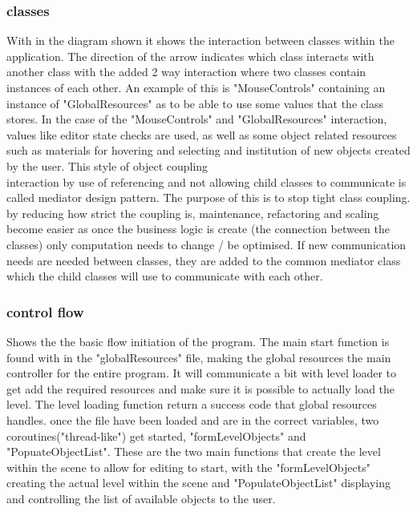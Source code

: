 \subsubsection{classes}
With in the diagram shown  it shows the interaction between classes within the application. The direction of the arrow indicates which class interacts with another class with the added 2 way interaction where two classes contain instances of each other. An example of this is "MouseControls" containing an instance of "GlobalResources" as to be able to use some values that the class stores. In the case of the "MouseControls" and "GlobalResources" interaction, values like editor state checks are used, as well as some object related resources such as materials for hovering and selecting and institution of new objects created by the user.
This style of object coupling \\ interaction by use of referencing and not allowing child classes to communicate is called mediator design pattern. The purpose of this is to stop tight class coupling. by reducing how strict the coupling is, maintenance, refactoring and scaling become easier as once the business logic is create (the connection between the classes) only computation needs to change / be optimised. If new communication needs are needed between classes, they are added to the common mediator class which the child classes will use to communicate with each other. 
\subsubsection{control flow}
 Shows the the basic flow initiation of the program. The main start function is found with in the "globalResources" file, making the global resources the main controller for the entire program. It will communicate a bit with level loader to get add the required resources and make sure it is possible to actually load the level. The level loading function return a success code that global resources handles. 
once the file have been loaded and are in the correct variables, two coroutines("thread-like") get started, "formLevelObjects" and "PopuateObjectList". These are the two main functions that create the level within the scene to allow for editing to start, with the "formLevelObjects" creating the actual level within the scene and "PopulateObjectList" displaying and controlling the list of available objects to the user.

